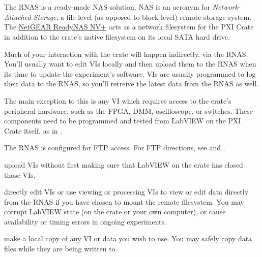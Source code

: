 \section{}
\label{sec:eq_readynas}

The \gls{RNAS} is a ready-made NAS solution.  NAS is an acronym for \textit{Network-Attached Storage}, a file-level (as opposed to block-level) remote storage system.  The \href{http://www.netgear.com/Products/Storage/ReadyNASNVPlus.aspx}{NetGEAR ReadyNAS NV+} acts as a network filesystem for the \gls{PXI Crate} in addition to the crate's native filesystem on its local SATA hard drive.

Much of your interaction with the crate will happen indirectly, via the \gls{RNAS}.  You'll usually want to edit VIs locally and then upload them to the \gls{RNAS} when its time to update the experiment's software.  VIs are usually programmed to log their data to the \gls{RNAS}, so you'll retreive the latest data from the \gls{RNAS} as well.

The main exception to this is any VI which requires access to the crate's peripheral hardware, such as the FPGA, DMM, oscilloscope, or switches.  These components need to be programmed and tested from LabVIEW on the PXI Crate itself, as in .

The \gls{RNAS} is configured for FTP access.  
For FTP directions, see  and .

\begin{pleasedonot} upload VIs without first making sure that LabVIEW on the crate has closed those VIs.\end{pleasedonot}

\begin{pleasedonot} directly edit VIs or use viewing or processing VIs to view or edit data directly from the \gls{RNAS} if you have chosen to mount the remote filesystem.  You may corrupt LabVIEW state (on the crate or your own computer), or cause availability or timing errors in ongoing experiments.\end{pleasedonot}

\begin{pleasedo} make a local copy of any VI or data you wish to use.  You may safely copy data files while they are being written to.\end{pleasedo}



